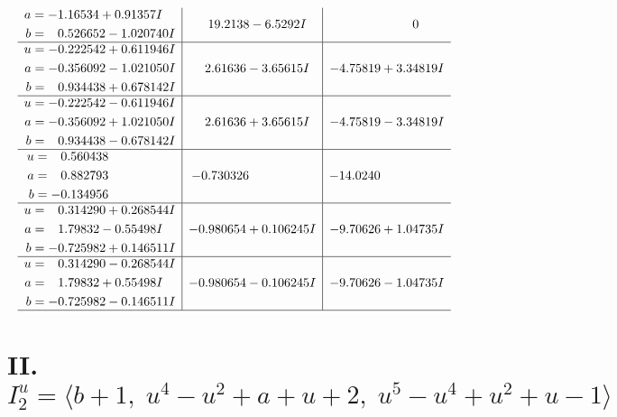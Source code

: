 \documentclass[1p]{elsarticle_modified}
\theoremstyle{definition}
\begin{document}
$$\begin{array}{c|c|c}
\begin{aligned}
a &= -1.16534 + 0.91357 I \\
b &= \phantom{-}0.526652 - 1.020740 I\end{aligned}
 & \phantom{-}19.2138 - 6.5292 I & \phantom{-0.000000 } 0 \\ \hline\begin{aligned}
u &= -0.222542 + 0.611946 I \\
a &= -0.356092 - 1.021050 I \\
b &= \phantom{-}0.934438 + 0.678142 I\end{aligned}
 & \phantom{-}2.61636 - 3.65615 I & -4.75819 + 3.34819 I \\ \hline\begin{aligned}
u &= -0.222542 - 0.611946 I \\
a &= -0.356092 + 1.021050 I \\
b &= \phantom{-}0.934438 - 0.678142 I\end{aligned}
 & \phantom{-}2.61636 + 3.65615 I & -4.75819 - 3.34819 I \\ \hline\begin{aligned}
u &= \phantom{-}0.560438\phantom{ +0.000000I} \\
a &= \phantom{-}0.882793\phantom{ +0.000000I} \\
b &= -0.134956\phantom{ +0.000000I}\end{aligned}
 & -0.730326\phantom{ +0.000000I} & -14.0240\phantom{ +0.000000I} \\ \hline\begin{aligned}
u &= \phantom{-}0.314290 + 0.268544 I \\
a &= \phantom{-}1.79832 - 0.55498 I \\
b &= -0.725982 + 0.146511 I\end{aligned}
 & -0.980654 + 0.106245 I & -9.70626 + 1.04735 I \\ \hline\begin{aligned}
u &= \phantom{-}0.314290 - 0.268544 I \\
a &= \phantom{-}1.79832 + 0.55498 I \\
b &= -0.725982 - 0.146511 I\end{aligned}
 & -0.980654 - 0.106245 I & -9.70626 - 1.04735 I\\
 \hline 
 \end{array}$$\newpage\newpage\renewcommand{\arraystretch}{1}
\centering \section*{II. $I^u_{2}= \langle b+1,\;u^4- u^2+a+u+2,\;u^5- u^4+u^2+u-1 \rangle$}
\end{document}
